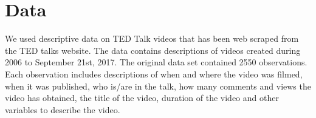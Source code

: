 \section{Data}
We used descriptive data on TED Talk videos that has been web scraped from the TED talks website. The data contains descriptions of videos created during 2006 to September 21st, 2017. The original data set contained 2550 observations. Each observation includes descriptions of when and where the video was filmed, when it was published, who is/are in the talk, how many comments and views the video has obtained, the title of the video, duration of the video and other variables to describe the video.